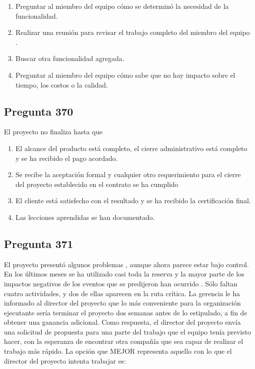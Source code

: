 \documentclass[11pt,a4paper]{article}
\begin{document}
\begin{enumerate}[label=\alph*)]
  \item Preguntar al miembro del equipo cómo se determinó la necesidad de la funcionalidad.
  \item Realizar una reunión para revisar el trabajo completo del miembro del equipo .
  \item Buscar otra funcionalidad agregada.
  \item Preguntar al miembro del equipo cómo sabe que no hay impacto sobre el tiempo, los costos o la calidad.
\end{enumerate}

\subsection*{Pregunta 370}
El proyecto no finaliza hasta que

\begin{enumerate}[label=\alph*)]
  \item El alcance del producto está completo, el cierre administrativo está completo y se ha recibido el pago acordado.
  \item Se recibe la aceptación formal y cualquier otro requerimiento para el cierre del proyecto establecido en el contrato se ha cumplido
  \item El cliente está satisfecho con el resultado y se ha recibido la certificación final.
  \item Las lecciones aprendidas se han documentado.
\end{enumerate}

\subsection*{Pregunta 371}
El proyecto presentó algunos problemas , aunque ahora parece estar bajo control. En los últimos meses se ha utilizado casi toda la reserva y la mayor parte de los impactos negativos de los eventos que se predijeron han ocurrido . Sólo faltan cuatro actividades, y dos de ellas aparecen en la ruta crítica. La gerencia le ha informado al director del proyecto que lo más conveniente para la organización ejecutante sería terminar el proyecto dos semanas antes de lo estipulado, a fin de obtener una ganancia adicional. Como respuesta, el director del proyecto envía una solicitud de propuesta para una parte del trabajo que el equipo tenía previsto hacer, con la esperanza de encontrar otra compañía que sea capaz de realizar el trabajo más rápido. La opción que MEJOR representa aquello con lo que el director del proyecto intenta trabajar es:
\end{document}
